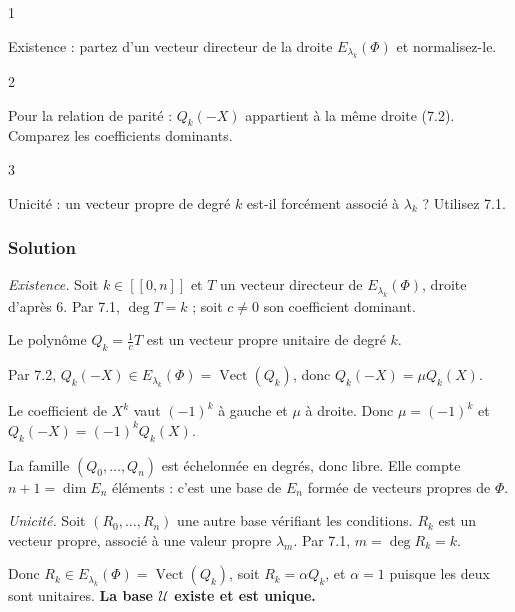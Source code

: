 \documentclass[11pt,a4paper]{article}
\begin{document}
\begin{indication}{1}

Existence : partez d'un vecteur directeur de la droite \(E_{\lambda_k}(\Phi)\) et normalisez-le.

\end{indication}

\begin{indication}{2}

Pour la relation de parité : \(Q_k(-X)\) appartient à la même droite (7.2). Comparez les coefficients dominants.

\end{indication}

\begin{indication}{3}

Unicité : un vecteur propre de degré \(k\) est-il forcément associé à \(\lambda_k\) ? Utilisez 7.1.

\end{indication}

\hypertarget{solution-28}{%
\subsubsection{Solution}\label{solution-28}}

\emph{Existence.} Soit \(k\in[\![0,n]\!]\) et \(T\) un vecteur directeur de \(E_{\lambda_k}(\Phi)\), droite d'après 6. Par 7.1, \(\deg T=k\) ; soit \(c\neq0\) son coefficient dominant.

Le polynôme \(Q_k=\frac1cT\) est un vecteur propre unitaire de degré \(k\).

Par 7.2, \(Q_k(-X)\in E_{\lambda_k}(\Phi)=\operatorname{Vect}(Q_k)\), donc \(Q_k(-X)=\mu Q_k(X)\).

Le coefficient de \(X^k\) vaut \((-1)^k\) à gauche et \(\mu\) à droite. Donc \(\mu=(-1)^k\) et \(Q_k(-X)=(-1)^kQ_k(X)\).

La famille \((Q_0,\dots,Q_n)\) est échelonnée en degrés, donc libre. Elle compte \(n+1=\dim E_n\) éléments : c'est une base de \(E_n\) formée de vecteurs propres de \(\Phi\).

\emph{Unicité.} Soit \((R_0,\dots,R_n)\) une autre base vérifiant les conditions. \(R_k\) est un vecteur propre, associé à une valeur propre \(\lambda_m\). Par 7.1, \(m=\deg R_k=k\).

Donc \(R_k\in E_{\lambda_k}(\Phi)=\operatorname{Vect}(Q_k)\), soit \(R_k=\alpha Q_k\), et \(\alpha=1\) puisque les deux sont unitaires. \textbf{La base \(\mathcal U\) existe et est unique.}
\end{document}
